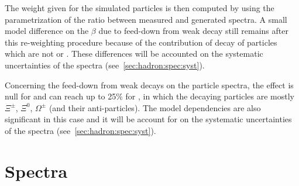 The weight given for the simulated particles is then
computed by using the parametrization of the ratio between
measured and generated spectra. A small model difference
on the $\beta$ due to feed-down from weak decay still remains
after this re-weighting procedure because of the contribution
of decay of particles which are not \lambs or \kzeros.
These differences will be accounted on the systematic
uncertainties of the spectra (see~\cref{sec:hadron:spec:syst}).

Concerning the feed-down from weak decays on the \vzero particle
spectra, the effect is null for \kzeros and can reach up to 25\%
for \lambs, in which the decaying particles are mostly $\Xi^{\pm}$, $\Xi^0$,
$\Omega^\pm$ (and their anti-particles). The model dependencies are also
significant in this case and it will be account for
on the systematic uncertainties of the spectra (see~\cref{sec:hadron:spec:syst}).


\section{Spectra}
\label{sec:hadron:spec}

